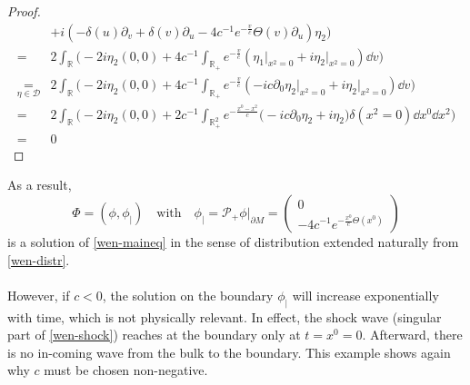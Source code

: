 \begin{proof}
\begin{equation*}
\begin{split}
&+ i (-\delta(u)\partial_v + \delta(v)\partial_u-4c^{-1}e^{-\frac{v}{c}}\Theta(v)\partial_u)\eta_2
\Big)\\ 
%
=& 2\int_{\mathbb{R}}\Big( -2i\eta_2 (0,0) + 4c^{-1}\int_{\mathbb{R}_+}e^{-\frac v c }(\eta_1\vert_{x^2 = 0} +i \eta_2\vert_{x^2 = 0}) \dd v\Big) \\ 
%
\underset{\eta\in \mathcal{D}} =& 2\int_{\mathbb{R}}\Big( -2i\eta_2 (0,0) + 4c^{-1}\int_{\mathbb{R}_+}e^{-\frac v c }(-ic \partial_0\eta_2\vert_{x^2 = 0} +i\eta_2\vert_{x^2 = 0}) \dd v\Big) \\ 
% 
=& 2\int_{\mathbb{R}}\Big( -2i\eta_2 (0,0) + 2c^{-1}\int_{\mathbb{R}^2_+}e^{-\frac{x^0-x^2} {c} }\big(-ic \partial_0\eta_2 +i\eta_2\big)\delta(x^2 = 0) \dd x^0 \dd x^2\Big) \\ 
=& 0
\end{split}
\end{equation*}
\end{proof}
As a result, 
\begin{equation*}\Phi = (\phi, \phi_|) \quad \mathrm{with}\quad \phi_| = \mathcal{P}_+ \phi\vert_{\partial M} = 
\begin{pmatrix} 0 \\ -4c^{-1}e^{- \frac{x^0}{c} \Theta(x^0)} \end{pmatrix}
\end{equation*}
 is a solution of \cref{wen-maineq} in the sense of distribution extended naturally from \cref{wen-distr}. \\\\
However, if $c<0$, the solution on the boundary $\phi_|$ will increase exponentially with time, which is not physically relevant. 
In effect, the shock wave (singular part of \cref{wen-shock}) reaches at the boundary only at $t = x^0 = 0$.
Afterward, there is no in-coming wave from the bulk to the boundary. 
This example shows again why $c$ must be chosen non-negative.













